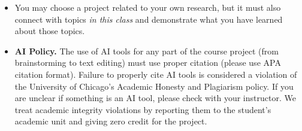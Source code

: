 \documentclass[11pt]{article}
\begin{document}
\begin{itemize}
\begin{itemize}
  \item PCA and autoencoder neural networks
  \item (Stochastic) gradient descent and variants
  \item Double descent in linear problems
  \item Applications to other domains of sciences
\end{itemize}
\item You may choose a project related to your own research, but it must also connect with topics {\em in this class} and demonstrate what you have learned about those topics.
\item \textbf{AI Policy.} The use of AI tools for any part of the course project (from brainstorming to text editing) must use proper citation (please use APA citation format). Failure to properly cite AI tools is considered a violation of the University of Chicago's Academic Honesty and Plagiarism policy. If you are unclear if something is an AI tool, please check with your instructor. We treat academic integrity violations by reporting them to the student's academic unit and giving zero credit for the project.
\end{itemize}
\end{document}
